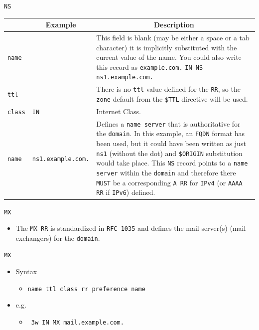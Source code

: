 \documentclass[aspectratio=169,xcolor=table]{beamer}
\begin{document}
\begin{frame}{\texttt{NS}}
  \begin{table}
    \tiny
    \begin{tabular}{|p{1.6cm}|p{1.6cm}|p{5.7cm}|} 
      \hline
      \rowcolor{gray}
      \multicolumn{1}{|c|}{Syntax} & \multicolumn{1}{c|}{Example} & \multicolumn{1}{c|}{Description}\\ 
      \hline
      \texttt{name}&&This field is blank (may be either a space or a tab character) it is implicitly substituted with the current value of the name. You could also write this record as \texttt{example.com.} \texttt{IN NS ns1.example.com.}\\
      \hline
      \texttt{ttl}&&There is no \texttt{ttl} value defined for the \texttt{RR}, so the \texttt{zone} default from the \texttt{\$TTL} directive will be used.\\
      \hline
      \texttt{class}&\texttt{IN}&Internet Class.\\
      \hline
      \texttt{name}&\texttt{ns1.example.com.}&Defines a \texttt{name server} that is authoritative for the \texttt{domain}. In this example, an \texttt{FQDN} format has been used, but it could have been
      written as just \texttt{ns1} (without the dot) and \texttt{\$ORIGIN} substitution would take place. This \texttt{NS} record points to a \texttt{name server} within the \texttt{domain} and therefore there \texttt{MUST} be a corresponding \texttt{A RR} for \texttt{IPv4} (or \texttt{AAAA RR}
      if \texttt{IPv6}) defined.\\
      \hline
    \end{tabular}
  \end{table}
\end{frame}

\begin{frame}{\texttt{MX}}
  \begin{itemize}
      \item The \texttt{MX RR} is standardized in \texttt{RFC 1035} and defines the mail server(s) (mail exchangers) for the \texttt{domain}.
  \end{itemize}
\end{frame}

\begin{frame}{\texttt{MX}}
  \begin{itemize}
    \item Syntax
      \begin{itemize}
        \item \texttt{name ttl class rr preference name}
      \end{itemize}
    \item e.g.
      \begin{itemize}
        \item \texttt{ 3w IN MX mail.example.com.}
      \end{itemize}
  \end{itemize}
\end{frame}
\end{document}
